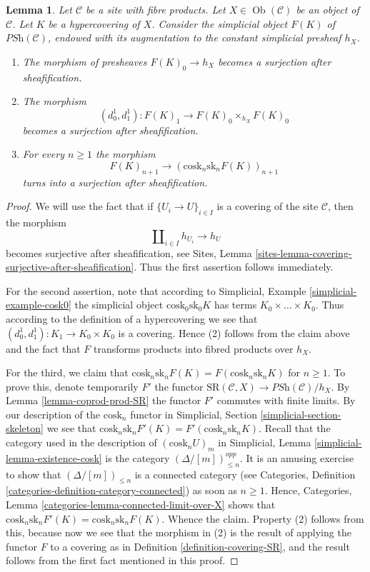 \documentclass[10pt,a4paper]{amsart}
\theoremstyle{plain}
\newtheorem{lemma}[subsection]{Lemma}
\theoremstyle{definition}
\theoremstyle{remark}
\numberwithin{equation}{subsection}
\def\Ob{\mathop{\mathrm{Ob}}\nolimits}
\begin{document}
\begin{lemma}
\label{lemma-hypercovering-F}
Let $\mathcal{C}$ be a site with fibre products.
Let $X \in \Ob(\mathcal{C})$ be an object of $\mathcal{C}$.
Let $K$ be a hypercovering of $X$.
Consider the simplicial object $F(K)$ of $\textit{PSh}(\mathcal{C})$,
endowed with its augmentation to the constant simplicial presheaf $h_X$.
\begin{enumerate}
\item The morphism of presheaves $F(K)_0 \to h_X$ becomes
a surjection after sheafification.
\item The morphism
$$
(d^1_0, d^1_1) :
F(K)_1
\longrightarrow
F(K)_0 \times_{h_X} F(K)_0
$$
becomes a surjection after sheafification.
\item For every $n \geq 1$ the morphism
$$
F(K)_{n + 1} \longrightarrow (\text{cosk}_n \text{sk}_n F(K))_{n + 1}
$$
turns into a surjection after sheafification.
\end{enumerate}
\end{lemma}

\begin{proof}
We will use the fact that if
$\{U_i \to U\}_{i \in I}$ is a covering of the site
$\mathcal{C}$, then the morphism
$$
\amalg_{i \in I} h_{U_i} \to h_U
$$
becomes surjective after sheafification, see
Sites, Lemma \ref{sites-lemma-covering-surjective-after-sheafification}.
Thus the first assertion follows immediately.

\medskip\noindent
For the second assertion, note that according to
Simplicial, Example \ref{simplicial-example-cosk0}
the simplicial object $\text{cosk}_0 \text{sk}_0 K$
has terms $K_0 \times \ldots \times K_0$. Thus
according to the definition of a hypercovering we
see that $(d^1_0, d^1_1) : K_1 \to K_0 \times K_0$ is a
covering. Hence (2) follows from the claim above
and the fact that $F$ transforms products into fibred
products over $h_X$.

\medskip\noindent
For the third, we claim that
$\text{cosk}_n \text{sk}_n F(K) =
F(\text{cosk}_n \text{sk}_n K)$ for $n \geq 1$.
To prove this, denote temporarily $F'$ the functor
$\text{SR}(\mathcal{C}, X) \to \textit{PSh}(\mathcal{C})/h_X$.
By Lemma \ref{lemma-coprod-prod-SR} the functor
$F'$ commutes with finite limits.
By our description of the $\text{cosk}_n$ functor in
Simplicial, Section \ref{simplicial-section-skeleton}
we see that $\text{cosk}_n \text{sk}_n F'(K) =
F'(\text{cosk}_n \text{sk}_n K)$.
Recall that the category used in the description of
$(\text{cosk}_n U)_m$ in
Simplicial, Lemma \ref{simplicial-lemma-existence-cosk}
is the category $(\Delta/[m])^{opp}_{\leq n}$. It is an
amusing exercise to show that $(\Delta/[m])_{\leq n}$ is
a connected category (see
Categories, Definition \ref{categories-definition-category-connected})
as soon as $n \geq 1$. Hence,
Categories, Lemma \ref{categories-lemma-connected-limit-over-X}
shows that $\text{cosk}_n \text{sk}_n F'(K) =
\text{cosk}_n \text{sk}_n F(K)$. Whence the claim.
Property (2) follows from this, because now we see that
the morphism in (2) is the result of applying the
functor $F$ to a covering as in Definition \ref{definition-covering-SR},
and the result follows from the first fact mentioned
in this proof.
\end{proof}
\end{document}
